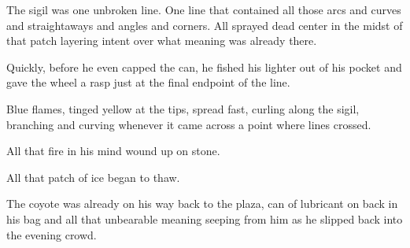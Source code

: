 The sigil was one unbroken line. One line that contained all those arcs and curves and straightaways and angles and corners. All sprayed dead center in the midst of that patch layering intent over what meaning was already there.

Quickly, before he even capped the can, he fished his lighter out of his pocket and gave the wheel a rasp just at the final endpoint of the line.

Blue flames, tinged yellow at the tips, spread fast, curling along the sigil, branching and curving whenever it came across a point where lines crossed.

All that fire in his mind wound up on stone.

All that patch of ice began to thaw.

The coyote was already on his way back to the plaza, can of lubricant on back in his bag and all that unbearable meaning seeping from him as he slipped back into the evening crowd.
